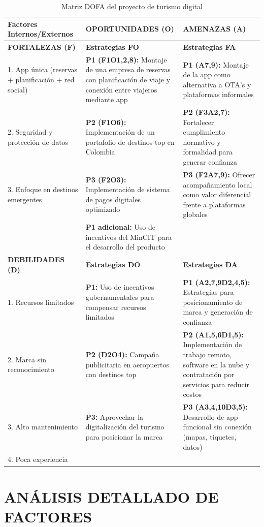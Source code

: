 \documentclass[12pt,a4paper]{article}
\newcommand{\sectiontitle}[1]{\section{#1}}
\begin{document}
\begin{table}[H]
\centering
\tiny
\begin{tabular}{|p{2.8cm}|p{4.2cm}|p{4.2cm}|}
\hline
\textbf{Factores Internos/Externos} & \textbf{OPORTUNIDADES (O)} & \textbf{AMENAZAS (A)} \\
\hline
\textbf{FORTALEZAS (F)} & 
\textbf{Estrategias FO} & 
\textbf{Estrategias FA} \\
1. App única (reservas + planificación + red social) & 
\textbf{P1 (F1O1,2,8):} Montaje de una empresa de reservas con planificación de viaje y conexión entre viajeros mediante app & 
\textbf{P1 (A7,9):} Montaje de la app como alternativa a OTA's y plataformas informales \\
2. Seguridad y protección de datos & 
\textbf{P2 (F1O6):} Implementación de un portafolio de destinos top en Colombia & 
\textbf{P2 (F3A2,7):} Fortalecer cumplimiento normativo y formalidad para generar confianza \\
3. Enfoque en destinos emergentes & 
\textbf{P3 (F2O3):} Implementación de sistema de pagos digitales optimizado & 
\textbf{P3 (F2A7,9):} Ofrecer acompañamiento local como valor diferencial frente a plataformas globales \\
& 
\textbf{P1 adicional:} Uso de incentivos del MinCIT para el desarrollo del producto & 
\\
\hline
\textbf{DEBILIDADES (D)} & 
\textbf{Estrategias DO} & 
\textbf{Estrategias DA} \\
1. Recursos limitados & 
\textbf{P1:} Uso de incentivos gubernamentales para compensar recursos limitados & 
\textbf{P1 (A2,7,9D2,4,5):} Estrategias para posicionamiento de marca y generación de confianza \\
2. Marca sin reconocimiento & 
\textbf{P2 (D2O4):} Campaña publicitaria en aeropuertos con destinos top & 
\textbf{P2 (A1,5,6D1,5):} Implementación de trabajo remoto, software en la nube y contratación por servicios para reducir costos \\
3. Alto mantenimiento & 
\textbf{P3:} Aprovechar la digitalización del turismo para posicionar la marca & 
\textbf{P3 (A3,4,10D3,5):} Desarrollo de app funcional sin conexión (mapas, tiquetes, datos) \\
4. Poca experiencia & 
 & 
\\
\hline
\end{tabular}
\caption{Matriz DOFA del proyecto de turismo digital}
\end{table}

\sectiontitle{ANÁLISIS DETALLADO DE FACTORES}
\end{document}
